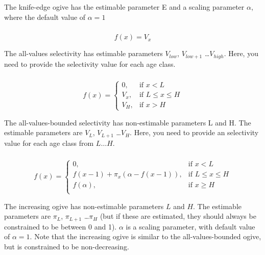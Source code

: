 The knife-edge ogive has the estimable parameter E and a scaling parameter $\alpha$, where the default value of $\alpha = 1$

\subsubsection[All-values]{}

\begin{equation}
f(x)=V_x
\end{equation}

The all-values selectivity has estimable parameters $V_{low}$, $V_{low+1}$ \ldots $V_{high}$. Here, you need to provide the selectivity value for each age class.

\subsubsection[All-values-bounded]{}

\begin{equation}
f(x)=\begin{cases}
		 0, & \text{if $x < L$} \\
		 V_x, & \text{if $L \le x \le H$} \\
		 V_H, & \text{if $x > H$}
  \end{cases}
\end{equation}

The all-values-bounded selectivity has non-estimable parameters L and H. The estimable parameters are $V_L$, $V_{L+1}$ \ldots $V_H$. Here, you need to provide an selectivity value for each age class from $L \ldots H$.

\subsubsection[Increasing]{}

\begin{equation} 
f(x)=\begin{cases}
	  0, & \text{if $x < L$} \\
	  f(x-1)+ \pi_x(\alpha-f(x-1)), & \text{if $L \le x \le H$} \\
	  f(\alpha), & \text{if $x \ge H$} \\  
  \end{cases}
\end{equation}

The increasing ogive has non-estimable parameters $L$ and $H$. The estimable parameters are $\pi_L$, $\pi_{L+1}$ \ldots $\pi_H$ (but if these are estimated, they should always be constrained to be between 0 and 1). $\alpha$ is a scaling parameter, with default value of $\alpha = 1$. Note that the increasing ogive is similar to the all-values-bounded ogive, but is constrained to be non-decreasing.

